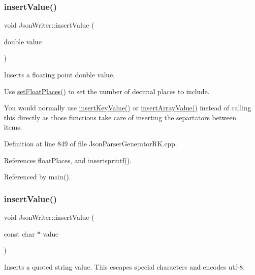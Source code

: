 \subsubsection{\texorpdfstring{insert\+Value()}{insertValue()}\hspace{0.1cm}{\footnotesize\ttfamily [7/9]}}
{\footnotesize\ttfamily void Json\+Writer\+::insert\+Value (\begin{DoxyParamCaption}\item[{double}]{value }\end{DoxyParamCaption})}



Inserts a floating point double value. 

Use \hyperlink{class_json_writer_aecd4d984a49fe59b0c4d892fe6d1e791}{set\+Float\+Places()} to set the number of decimal places to include.

You would normally use \hyperlink{class_json_writer_ac2de627389b59ce2c8ed95e10ea213bf}{insert\+Key\+Value()} or \hyperlink{class_json_writer_a8b4dc6726b66b4f277c7674e60c8a057}{insert\+Array\+Value()} instead of calling this directly as those functions take care of inserting the separtators between items. 

Definition at line 849 of file Json\+Parser\+Generator\+R\+K.\+cpp.



References float\+Places, and insertsprintf().



Referenced by main().

\mbox{\label{class_json_writer_aeac7ad2b336bb15c05a6094a59a42126}} 
\subsubsection{\texorpdfstring{insert\+Value()}{insertValue()}\hspace{0.1cm}{\footnotesize\ttfamily [8/9]}}
{\footnotesize\ttfamily void Json\+Writer\+::insert\+Value (\begin{DoxyParamCaption}\item[{const char $\ast$}]{value }\end{DoxyParamCaption})\hspace{0.3cm}{\ttfamily [inline]}}



Inserts a quoted string value. This escapes special characters and encodes utf-\/8. 

